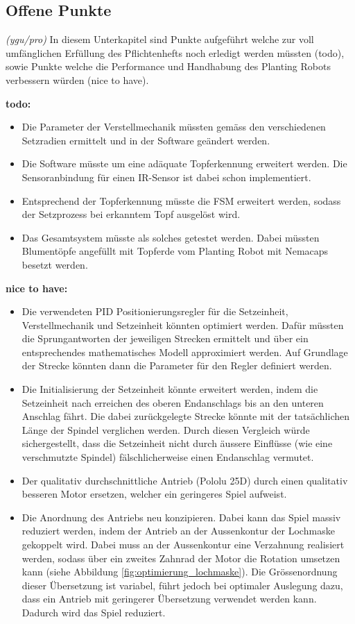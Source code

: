 \subsection{Offene Punkte}
\textit{(ygu/pro)} In diesem Unterkapitel sind Punkte aufgeführt welche zur voll umfänglichen Erfüllung des Pflichtenhefts noch erledigt werden müssten (todo), sowie Punkte welche die Performance und Handhabung des Planting Robots verbessern würden (nice to have). 
\newline

\textbf{todo:}
\begin{itemize}
	\item Die Parameter der Verstellmechanik müssten gemäss den verschiedenen Setzradien ermittelt und in der Software geändert werden.
	\item Die Software müsste um eine adäquate Topferkennung erweitert werden. Die Sensoranbindung für einen IR-Sensor ist dabei schon implementiert.
	\item Entsprechend der Topferkennung müsste die FSM erweitert werden, sodass der Setzprozess bei erkanntem Topf ausgelöst wird.
	\item Das Gesamtsystem müsste als solches getestet werden. Dabei müssten Blumentöpfe angefüllt mit Topferde vom Planting Robot mit Nemacaps besetzt werden.
\end{itemize}

\textbf{nice to have:}
\begin{itemize}
	\item Die verwendeten PID Positionierungsregler für die Setzeinheit, Verstellmechanik und Setzeinheit könnten optimiert werden. Dafür müssten die Sprungantworten der jeweiligen Strecken ermittelt und über ein entsprechendes mathematisches Modell approximiert werden. Auf Grundlage der Strecke könnten dann die Parameter für den Regler definiert werden.
	\item Die Initialisierung der Setzeinheit könnte erweitert werden, indem die Setzeinheit nach erreichen des oberen Endanschlags bis an den unteren Anschlag fährt. Die dabei zurückgelegte Strecke könnte mit der tatsächlichen Länge der Spindel verglichen werden. Durch diesen Vergleich würde sichergestellt, dass die Setzeinheit nicht durch äussere Einflüsse (wie eine verschmutzte Spindel) fälschlicherweise einen Endanschlag vermutet.
	\item Der qualitativ durchschnittliche Antrieb (Pololu 25D) durch einen qualitativ besseren Motor ersetzen, welcher ein geringeres Spiel aufweist.
	\item Die Anordnung des Antriebs neu konzipieren. Dabei kann das Spiel massiv reduziert werden, indem der Antrieb an der Aussenkontur der Lochmaske gekoppelt wird. Dabei muss an der Aussenkontur eine Verzahnung realisiert werden, sodass über ein zweites Zahnrad der Motor die Rotation umsetzen kann (siehe Abbildung \ref{fig:optimierung_lochmaske}). Die Grössenordnung dieser Übersetzung ist variabel, führt jedoch bei optimaler Auslegung dazu, dass ein Antrieb mit geringerer Übersetzung verwendet werden kann. Dadurch wird das Spiel reduziert. 
\end{itemize}

